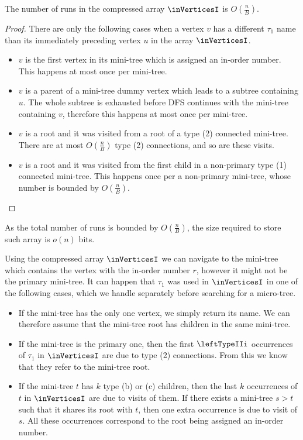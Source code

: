 \begin{lemma}
	The number of runs in the compressed array $\inVerticesI$ is $O(\frac{n}{B})$.
\end{lemma}
\begin{proof}
	There are only the following cases when a vertex $v$ has a different $\tau_1$ name than its immediately preceding vertex $u$ in the array $\inVerticesI$.
	\begin{itemize}
		\item $v$ is the first vertex in its mini-tree which is assigned an in-order number.
		This happens at most once per mini-tree.

		\item $v$ is a parent of a mini-tree dummy vertex which leads to a subtree containing $u$.
		The whole subtree is exhausted before DFS continues with the mini-tree containing $v$, therefore this happens at most once per mini-tree.

		\item $v$ is a root and it was visited from a root of a type (2) connected mini-tree.
		There are at most $O(\frac{n}{B})$ type (2) connections, and so are these visits.
		
		\item $v$ is a root and it was visited from the first child in a non-primary type (1) connected mini-tree.
		This happens once per a non-primary mini-tree, whose number is bounded by $O(\frac{n}{B})$.
	\end{itemize}
\end{proof}

As the total number of runs is bounded by $O(\frac{n}{B})$, the size required to store such array is $o(n)$ bits.

Using the compressed array $\inVerticesI$ we can navigate to the mini-tree which contains the vertex with the in-order number $r$, however it might not be the primary mini-tree.
It can happen that $\tau_1$ was used in $\inVerticesI$ in one of the following cases, which we handle separately before searching for a micro-tree.
\begin{itemize}
	\item If the mini-tree has the only one vertex, we simply return its name.
	We can therefore assume that the mini-tree root has children in the same mini-tree.
	
	\item If the mini-tree is the primary one, then the first $\leftTypeIIi$ occurrences of $\tau_1$ in $\inVerticesI$ are due to type (2) connections.
	From this we know that they refer to the mini-tree root.

	\item If the mini-tree $t$ has $k$ type (b) or (c) children, then the last $k$ occurrences of $t$ in $\inVerticesI$ are due to visits of them.
	If there exists a mini-tree $s > t$ such that it shares its root with $t$, then one extra occurrence is due to visit of $s$.
	All these occurrences correspond to the root being assigned an in-order number.
\end{itemize}

